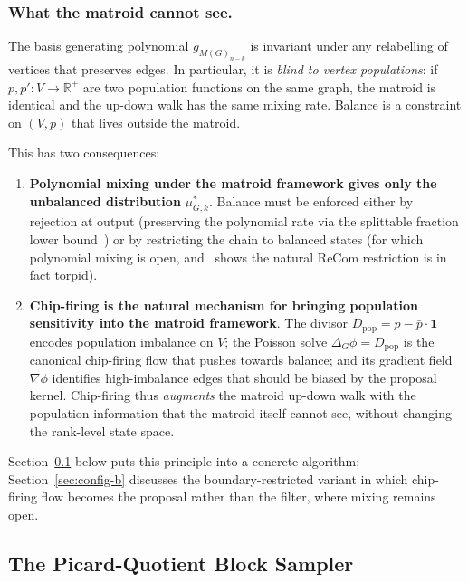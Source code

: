 \documentclass[11pt]{article}
\newcommand{\R}{\mathbb{R}}
\newcommand{\pbar}{\bar{p}}
\begin{document}
\subsubsection*{What the matroid cannot see.}

The basis generating polynomial $g_{M(G)_{n-k}}$ is invariant under any
relabelling of vertices that preserves edges. In particular, it is
\emph{blind to vertex populations}: if $p, p' : V \to \R^+$ are two
population functions on the same graph, the matroid is identical and
the up-down walk has the same mixing rate. Balance is a constraint on
$(V, p)$ that lives outside the matroid.

This has two consequences:

\begin{enumerate}
  \item \textbf{Polynomial mixing under the matroid framework gives
    only the unbalanced distribution} $\mu^*_{G,k}$. Balance must be
    enforced either by rejection at output (preserving the polynomial
    rate via the splittable fraction lower bound~\cite{cannon2024sampling})
    or by restricting the chain to balanced states (for which polynomial
    mixing is open, and~\cite[Theorem~15]{charikar2023complexity} shows
    the natural ReCom restriction is in fact torpid).
  \item \textbf{Chip-firing is the natural mechanism for bringing
    population sensitivity into the matroid framework}. The divisor
    $D_{\mathrm{pop}} = p - \pbar \cdot \mathbf{1}$ encodes population
    imbalance on $V$; the Poisson solve $\Delta_G \phi = D_{\mathrm{pop}}$
    is the canonical chip-firing flow that pushes towards balance; and
    its gradient field $\nabla \phi$ identifies high-imbalance edges that
    should be biased by the proposal kernel. Chip-firing thus
    \emph{augments} the matroid up-down walk with the population
    information that the matroid itself cannot see, without changing the
    rank-level state space.
\end{enumerate}

\noindent Section~\ref{sec:pqbs} below puts this principle into a
concrete algorithm; Section~\ref{sec:config-b} discusses the
boundary-restricted variant in which chip-firing flow becomes the
proposal rather than the filter, where mixing remains open.

\subsection{The Picard-Quotient Block Sampler}\label{sec:pqbs}
\end{document}
